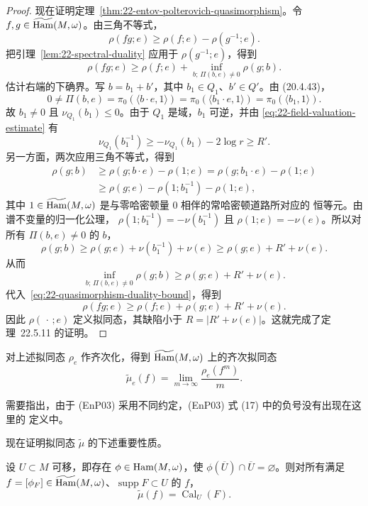 \begin{proof}
现在证明定理~\ref{thm:22-entov-polterovich-quasimorphism}。令
$f,g\in\widetilde{\operatorname{Ham}}(M,\omega)$。由三角不等式，
\[
 \rho(fg;e)\geq\rho(f;e)-\rho(g^{-1};e).
\]
把引理~\ref{lem:22-spectral-duality} 应用于 $\rho(g^{-1};e)$，得到
\begin{equation}
 \rho(fg;e)\geq\rho(f;e)+\inf_{b;\,\Pi(b,e)\neq0}\rho(g;b).
 \label{eq:22-quasimorphism-duality-bound}
\end{equation}
估计右端的下确界。写 $b=b_1+b'$，其中 $b_1\in Q_1$、$b'\in Q'$。由 (20.4.43)，
\[
 0\neq\Pi(b,e)=\pi_0(\langle b\cdot e,1\rangle)
 =\pi_0(\langle b_1\cdot e,1\rangle)=\pi_0(\langle b_1,1\rangle).
\]
故 $b_1\neq0$ 且 $\nu_{Q_1}(b_1)\leq0$。由于 $Q_1$ 是域，$b_1$ 可逆，并由
\eqref{eq:22-field-valuation-estimate} 有
\[
 \nu_{Q_1}(b_1^{-1})\geq-\nu_{Q_1}(b_1)-2\log r\geq R'.
\]
另一方面，两次应用三角不等式，得到
\begin{align*}
 \rho(g;b)&\geq\rho(g;b\cdot e)-\rho(1;e)
 =\rho(g;b_1\cdot e)-\rho(1;e)\\
 &\geq\rho(g;e)-\rho(1;b_1^{-1})-\rho(1;e),
\end{align*}
其中 $1\in\widetilde{\operatorname{Ham}}(M,\omega)$ 是与零哈密顿量 $0$ 相伴的常哈密顿道路所对应的
恒等元。由谱不变量的归一化公理，
$\rho(1;b_1^{-1})=-\nu(b_1^{-1})$ 且 $\rho(1;e)=-\nu(e)$。所以对所有
$\Pi(b,e)\neq0$ 的 $b$，
\[
 \rho(g;b)\geq\rho(g;e)+\nu(b_1^{-1})+\nu(e)
 \geq\rho(g;e)+R'+\nu(e).
\]
从而
\[
 \inf_{b;\,\Pi(b,e)\neq0}\rho(g;b)
 \geq\rho(g;e)+R'+\nu(e).
\]
代入~\eqref{eq:22-quasimorphism-duality-bound}，得到
\[
 \rho(fg;e)\geq\rho(f;e)+\rho(g;e)+R'+\nu(e).
\]
因此 $\rho(\,\cdot\,;e)$ 定义拟同态，其缺陷小于
$R=|R'+\nu(e)|$。这就完成了定理~22.5.11 的证明。
\end{proof}

对上述拟同态 $\rho_e$ 作齐次化，得到 $\widetilde{\operatorname{Ham}}(M,\omega)$ 上的齐次拟同态
\begin{equation}
 \widetilde\mu_e(f)=\lim_{m\to\infty}\frac{\rho_e(f^m)}m.
 \label{eq:22-homogeneous-calabi-quasimorphism}
\end{equation}

\begin{remark}
\label{rem:22-enp-sign-convention}
需要指出，由于 (EnP03) 采用不同约定，(EnP03) 式 (17) 中的负号没有出现在这里的
定义中。
\end{remark}

现在证明拟同态 $\widetilde\mu$ 的下述重要性质。

\begin{proposition}
\label{prop:22-calabi-property}
设 $U\subset M$ 可移，即存在 $\phi\in\operatorname{Ham}(M,\omega)$，使
$\phi(\overline U)\cap\overline U=\varnothing$。则对所有满足
$f=[\phi_F]\in\widetilde{\operatorname{Ham}}(M,\omega)$、$\operatorname{supp}F\subset U$ 的 $f$，
\[
 \widetilde\mu(f)=\operatorname{Cal}_U(F).
\]
\end{proposition}


